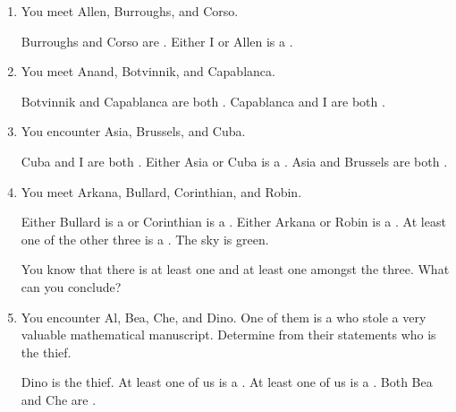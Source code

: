 \probsec{~\ref{sec:conjunctions}}
\begin{enumerate}
    \item You meet Allen, Burroughs, and Corso.
  \begin{dialogue}
     Burroughs and Corso are  \knights.
     Either I or Allen is a \knave.
  \end{dialogue}

    \item You meet Anand, Botvinnik, and Capablanca.
  \begin{dialogue}
     Botvinnik and Capablanca are both \knaves.
     Capablanca and I are both \knaves.
  \end{dialogue}

    \item You encounter Asia, Brussels, and Cuba.
  \begin{dialogue}
     Cuba and I are both \knights.
     Either Asia or Cuba is a \knave.
     Asia and Brussels are both \knaves.
  \end{dialogue}

  \item You meet Arkana, Bullard, Corinthian, and Robin.
  \begin{dialogue}
     Either Bullard is a \knight or Corinthian is a \knave.
     Either Arkana or Robin is a \knave.
     At least one of the other three is a \knave.
     The sky is green.
  \end{dialogue}
  You know that there is at least one \knight and at least one \knave amongst the three. What can you conclude?

  \item You encounter Al, Bea, Che, and Dino. One of them is a \knave who stole a very valuable mathematical manuscript. Determine from their statements who is the thief.
  \begin{dialogue}
     Dino is the thief.
     At least one of us is a \knight.
     At least one of us is a \knave.
     Both Bea and Che are \knights.
  \end{dialogue}

\end{enumerate}
